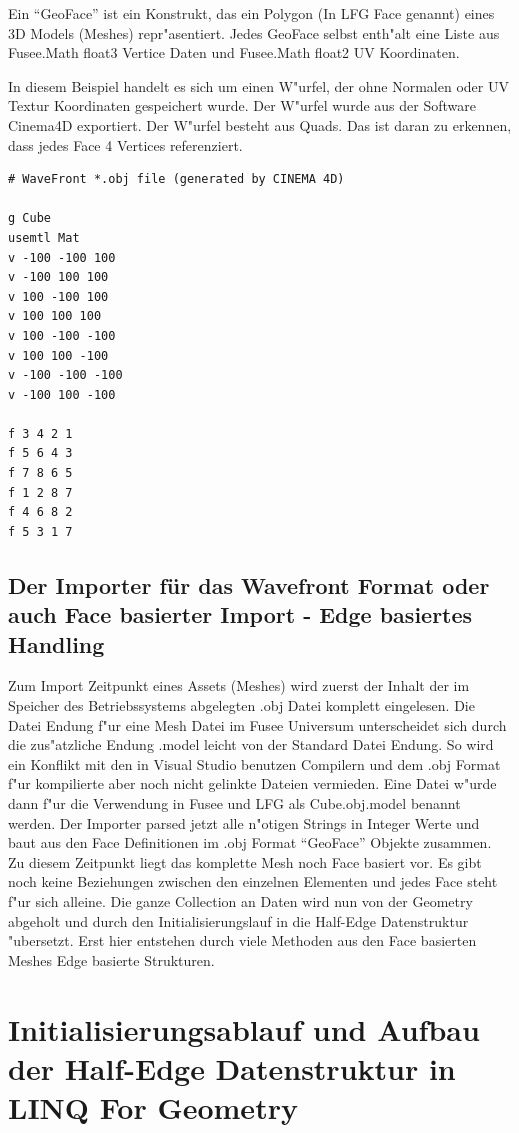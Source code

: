 \documentclass[pagesize, paper=a4, fontsize=12pt,titlepage=true, headings=small, headnosepline, abstractoff, liststotoc, nochapterprefix, plainheadsepline]{scrreprt}
\newcommand{\LFG}{LINQ For Geometry}
\newcommand{\HES}{Half-Edge Datenstruktur }
\begin{document}
Ein "`GeoFace"' ist ein Konstrukt, das ein Polygon (In LFG Face genannt) eines 3D Models (Meshes) repr"asentiert. Jedes GeoFace selbst enth"alt eine Liste aus Fusee.Math float3 Vertice Daten und Fusee.Math float2 UV Koordinaten.
\newline

In diesem Beispiel handelt es sich um einen W"urfel, der ohne Normalen oder UV Textur Koordinaten gespeichert wurde. Der W"urfel wurde aus der Software Cinema4D exportiert. Der W"urfel besteht aus Quads. Das ist daran zu erkennen, dass jedes Face 4 Vertices referenziert.
\begin{lstlisting}
# WaveFront *.obj file (generated by CINEMA 4D)

g Cube
usemtl Mat
v -100 -100 100
v -100 100 100
v 100 -100 100
v 100 100 100
v 100 -100 -100
v 100 100 -100
v -100 -100 -100
v -100 100 -100

f 3 4 2 1 
f 5 6 4 3 
f 7 8 6 5 
f 1 2 8 7 
f 4 6 8 2 
f 5 3 1 7 
\end{lstlisting}

		\subsection {Der Importer für das Wavefront Format oder auch Face basierter Import - Edge basiertes Handling}
			Zum Import Zeitpunkt eines Assets (Meshes) wird zuerst der Inhalt der im Speicher des Betriebssystems abgelegten .obj Datei komplett eingelesen. Die Datei Endung f"ur eine Mesh Datei im Fusee Universum unterscheidet sich durch die zus"atzliche Endung .model leicht von der Standard Datei Endung. So wird ein Konflikt mit den in Visual Studio benutzen Compilern und dem .obj Format f"ur kompilierte aber noch nicht gelinkte Dateien vermieden. Eine Datei w"urde dann f"ur die Verwendung in Fusee und LFG als Cube.obj.model benannt werden. Der Importer parsed jetzt alle n"otigen Strings in Integer Werte und baut aus den Face Definitionen im .obj Format "`GeoFace"' Objekte zusammen. Zu diesem Zeitpunkt liegt das komplette Mesh noch Face basiert vor. Es gibt noch keine Beziehungen zwischen den einzelnen Elementen und jedes Face steht f"ur sich alleine. Die ganze Collection an Daten wird nun von der Geometry abgeholt und durch den Initialisierungslauf in die \HES "ubersetzt. Erst hier entstehen durch viele Methoden aus den Face basierten Meshes Edge basierte Strukturen.
	\section {Initialisierungsablauf und Aufbau der \HES in \LFG}
\end{document}
